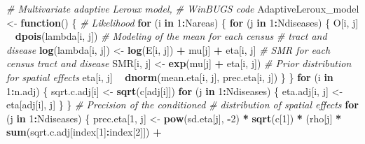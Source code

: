 \documentclass[]{article}
\newenvironment{Shaded}{\begin{snugshade}}{\end{snugshade}}
\newcommand{\KeywordTok}[1]{\textcolor[rgb]{0.13,0.29,0.53}{\textbf{#1}}}
\newcommand{\DecValTok}[1]{\textcolor[rgb]{0.00,0.00,0.81}{#1}}
\newcommand{\StringTok}[1]{\textcolor[rgb]{0.31,0.60,0.02}{#1}}
\newcommand{\CommentTok}[1]{\textcolor[rgb]{0.56,0.35,0.01}{\textit{#1}}}
\newcommand{\ControlFlowTok}[1]{\textcolor[rgb]{0.13,0.29,0.53}{\textbf{#1}}}
\newcommand{\OperatorTok}[1]{\textcolor[rgb]{0.81,0.36,0.00}{\textbf{#1}}}
\newcommand{\NormalTok}[1]{#1}
\begin{document}
\begin{Shaded}
\begin{Highlighting}[]
\CommentTok{# Multivariate adaptive Leroux model,}
\CommentTok{# WinBUGS code}
\NormalTok{AdaptiveLeroux_model <-}\StringTok{ }\ControlFlowTok{function}\NormalTok{() \{}
    \CommentTok{# Likelihood}
    \ControlFlowTok{for}\NormalTok{ (i }\ControlFlowTok{in} \DecValTok{1}\OperatorTok{:}\NormalTok{Nareas) \{}
        \ControlFlowTok{for}\NormalTok{ (j }\ControlFlowTok{in} \DecValTok{1}\OperatorTok{:}\NormalTok{Ndiseases) \{}
\NormalTok{            O[i, j] }\OperatorTok{~}\StringTok{ }\KeywordTok{dpois}\NormalTok{(lambda[i, j])}
            \CommentTok{# Modeling of the mean for each census}
            \CommentTok{# tract and disease}
            \KeywordTok{log}\NormalTok{(lambda[i, j]) <-}\StringTok{ }\KeywordTok{log}\NormalTok{(E[i, }
\NormalTok{                j]) }\OperatorTok{+}\StringTok{ }\NormalTok{mu[j] }\OperatorTok{+}\StringTok{ }\NormalTok{eta[i, j]}
            \CommentTok{# SMR for each census tract and disease}
\NormalTok{            SMR[i, j] <-}\StringTok{ }\KeywordTok{exp}\NormalTok{(mu[j] }\OperatorTok{+}\StringTok{ }\NormalTok{eta[i, }
\NormalTok{                j])}
            \CommentTok{# Prior distribution for spatial effects}
\NormalTok{            eta[i, j] }\OperatorTok{~}\StringTok{ }\KeywordTok{dnorm}\NormalTok{(mean.eta[i, }
\NormalTok{                j], prec.eta[i, j])}
\NormalTok{        \}}
\NormalTok{    \}}
    \ControlFlowTok{for}\NormalTok{ (i }\ControlFlowTok{in} \DecValTok{1}\OperatorTok{:}\NormalTok{n.adj) \{}
\NormalTok{        sqrt.c.adj[i] <-}\StringTok{ }\KeywordTok{sqrt}\NormalTok{(c[adj[i]])}
        \ControlFlowTok{for}\NormalTok{ (j }\ControlFlowTok{in} \DecValTok{1}\OperatorTok{:}\NormalTok{Ndiseases) \{}
\NormalTok{            eta.adj[i, j] <-}\StringTok{ }\NormalTok{eta[adj[i], }
\NormalTok{                j]}
\NormalTok{        \}}
\NormalTok{    \}}
    \CommentTok{# Precision of the conditioned}
    \CommentTok{# distribution of spatial effects}
    \ControlFlowTok{for}\NormalTok{ (j }\ControlFlowTok{in} \DecValTok{1}\OperatorTok{:}\NormalTok{Ndiseases) \{}
\NormalTok{        prec.eta[}\DecValTok{1}\NormalTok{, j] <-}\StringTok{ }\KeywordTok{pow}\NormalTok{(sd.eta[j], }
            \OperatorTok{-}\DecValTok{2}\NormalTok{) }\OperatorTok{*}\StringTok{ }\KeywordTok{sqrt}\NormalTok{(c[}\DecValTok{1}\NormalTok{]) }\OperatorTok{*}\StringTok{ }\NormalTok{(rho[j] }\OperatorTok{*}\StringTok{ }
\StringTok{            }\KeywordTok{sum}\NormalTok{(sqrt.c.adj[index[}\DecValTok{1}\NormalTok{]}\OperatorTok{:}\NormalTok{index[}\DecValTok{2}\NormalTok{]]) }\OperatorTok{+}\StringTok{ }

\end{Highlighting}
\end{Shaded}
\end{document}
